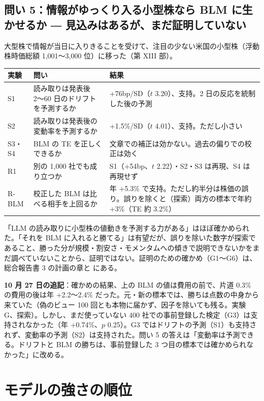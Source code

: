 \subsection{問い 5：情報がゆっくり入る小型株なら BLM に生かせるか ― 見込みはあるが、まだ証明していない}

大型株で情報が当日に入りきることを受けて、注目の少ない米国の小型株（浮動株時価総額 1,001〜3,000 位）に移った（第 XIII 部）。

\begin{longtable}{P{2.0cm}P{6.4cm}P{6.0cm}}
\toprule
\textbf{実験} & \textbf{問い} & \textbf{結果} \\
\midrule
\endhead
\bottomrule
\endfoot
S1 & 読み取りは発表後 2〜60 日のドリフトを予測するか & +76bp/SD（$t$ 3.20）、支持。2 日の反応を統制した後の予測 \\
S2 & 読み取りは発表後の変動率を予測するか & +1.5\%/SD（$t$ 4.01）、支持。ただし小さい \\
S3・S4 & BLM の TE を正しくできるか & 文章での補正は効かない。過去の偏りでの校正は効く \\
R1 & 別の 1,000 社でも成り立つか & S1（+54bp、$t$ 2.22）・S2・S3 は再現、S4 は再現せず \\
R-BLM & 校正した BLM は比べる相手を上回るか & 年 +5.3\% で支持。ただし約半分は株価の誤り。誤りを除くと（探索）両方の標本で年約 +3\%（TE 約 3.2\%） \\
\end{longtable}

「LLM の読み取りに小型株の値動きを予測する力がある」はほぼ確かめられた。「それを BLM に入れると勝てる」は有望だが、誤りを除いた数字が探索であること、勝った分が規模・割安さ・モメンタムへの傾きで説明できないかをまだ調べていないことから、証明ではない。証明のための確かめ（G1〜G6）は、総合報告書 3 の計画の章と  にある。

\textbf{10 月 27 日の追記}：確かめの結果、上の BLM の値は費用の前で、片道 0.3\% の費用の後は年 +2.2〜2.4\% だった。元・新の標本では、勝ちは点数の中身から来ていた（偽のビュー 100 回とも本物に届かず、因子を除いても残る。実験 G、探索）。しかし、まだ使っていない 400 社での事前登録した検定（G3）は支持されなかった（年 +0.74\%、$p$ 0.25）。G3 ではドリフトの予測（S1）も支持されず、変動率の予測（S2）は支持された。問い 5 の答えは「変動率は予測できる。ドリフトと BLM の勝ちは、事前登録した 3 つ目の標本では確かめられなかった」に改める。

\section{モデルの強さの順位}

